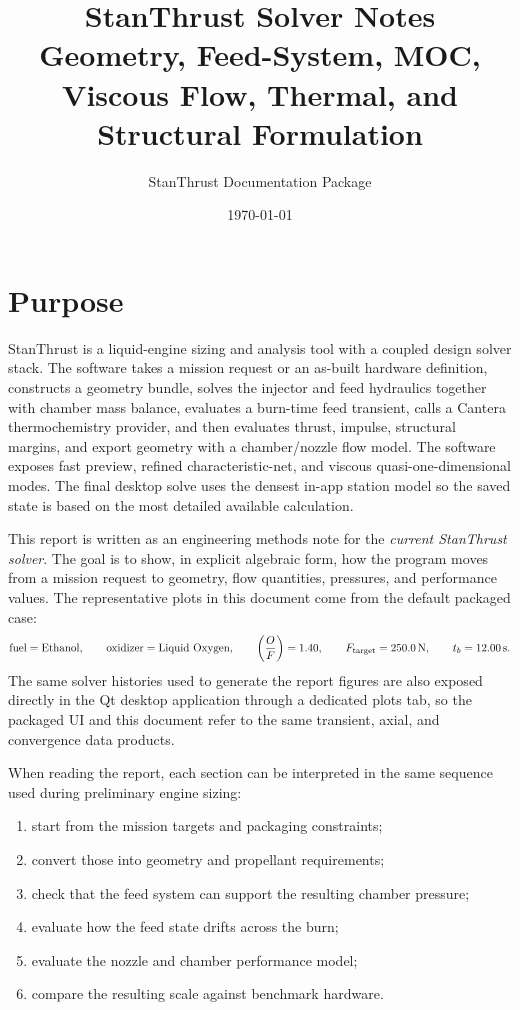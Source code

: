 \documentclass[11pt]{article}
\title{\textbf{StanThrust Solver Notes}\\\large Geometry, Feed-System, MOC, Viscous Flow, Thermal, and Structural Formulation}
\author{StanThrust Documentation Package}
\date{\today}
\newcommand{\OF}{\left(\frac{O}{F}\right)}
\begin{document}
\maketitle

\section{Purpose}
StanThrust is a liquid-engine sizing and analysis tool with a coupled design solver stack. The software takes a mission request or an as-built hardware definition, constructs a geometry bundle, solves the injector and feed hydraulics together with chamber mass balance, evaluates a burn-time feed transient, calls a Cantera thermochemistry provider, and then evaluates thrust, impulse, structural margins, and export geometry with a chamber/nozzle flow model. The software exposes fast preview, refined characteristic-net, and viscous quasi-one-dimensional modes. The final desktop solve uses the densest in-app station model so the saved state is based on the most detailed available calculation.

This report is written as an engineering methods note for the \emph{current StanThrust solver}. The goal is to show, in explicit algebraic form, how the program moves from a mission request to geometry, flow quantities, pressures, and performance values. The representative plots in this document come from the default packaged case:
\[
\text{fuel}=\text{\SampleFuel}, \qquad
\text{oxidizer}=\text{\SampleOxidizer}, \qquad
\OF=\SampleMixtureRatio, \qquad
F_{\text{target}}=\SI{\SampleTargetThrust}{N}, \qquad
t_b=\SI{\SampleBurnTime}{s}.
\]
The same solver histories used to generate the report figures are also exposed directly in the Qt desktop application through a dedicated plots tab, so the packaged UI and this document refer to the same transient, axial, and convergence data products.

When reading the report, each section can be interpreted in the same sequence used during preliminary engine sizing:
\begin{enumerate}[leftmargin=6mm]
\item start from the mission targets and packaging constraints;
\item convert those into geometry and propellant requirements;
\item check that the feed system can support the resulting chamber pressure;
\item evaluate how the feed state drifts across the burn;
\item evaluate the nozzle and chamber performance model;
\item compare the resulting scale against benchmark hardware.
\end{enumerate}
\end{document}
